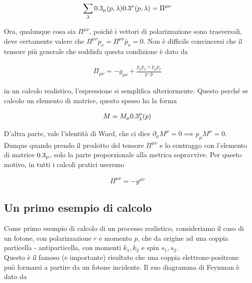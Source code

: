 \documentclass[11pt]{report}
\begin{document}
\begin{align}
    \sum_\lambda 0.3_\mu(p, \lambda)0.3^\nu (p, \lambda) = \Pi^{\mu\nu}
\end{align}

Ora, qualunque cosa sia \(\Pi^{\mu\nu}\), poiché i vettori di polarizzazione sono trasversali, deve certamente valere che \(\Pi^{\mu\nu}p_\nu = \Pi^{\mu\nu}\bar{p}_\nu = 0\). Non è difficile convincersi che il tensore più generale che soddisfa questa condizione è dato da 

\begin{align}
    \Pi_{\mu\nu} = -g_{\mu\nu} +\frac{p_\mu \bar{p}_\nu + \bar{p}_\mu p_\nu}{p\cdot \bar{p}}
\end{align}

in un calcolo realistico, l'espressione si semplifica ulteriormente. Questo perché se calcolo un elemento di matrice, questo spesso ha la forma 

\begin{align}
    M = M_\mu 0.3^\mu_\lambda(p)
\end{align}

D'altra parte, vale l'identità di Ward, che ci dice \(\partial_\mu M^\mu =0 \implies p_\mu M^\mu =0\). Dunque quando prendo il prodotto del tensore \(\Pi^{\mu\nu}\) e lo contraggo con l'elemento di matrice \(0.3_\mu\), solo la parte proporzionale alla metrica sopravvive. Per questo motivo, in tutti i calcoli pratici useremo 

\begin{align}
    \Pi^{\mu\nu} = -g^{\mu\nu}
\end{align}

\subsection{Un primo esempio di calcolo}

Come primo esempio di calcolo di un processo realistico, consideriamo il caso di un fotone, con polarizzazione \(r\) e momento \(p\), che da origine ad una coppia particella - antiparticella, con momenti \(k_1, k_2\) e spin \(s_1, s_2\). \\

Questo è il famoso (e importante) risultato che una coppia elettrone-positrone può formarsi a partire da un fotone incidente. Il suo diagramma di Feynman è dato da 

\begin{center}
\end{center}
\end{document}
